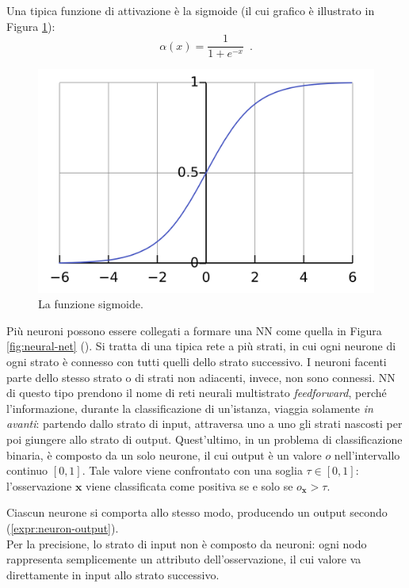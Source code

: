 Una tipica funzione di attivazione è la sigmoide (il cui grafico è illustrato in Figura \ref{fig:sigmoid}):
\begin{equation}
    \alpha(x) = \frac{1}{1+e^{-x}} \enspace .
\end{equation}

\begin{figure}[ht]
    \centering
    \includegraphics[width=0.5\linewidth]{images/sigmoid.png}
    \caption{La funzione sigmoide.}
    \label{fig:sigmoid}
\end{figure}

Più neuroni possono essere collegati a formare una NN come quella in Figura \ref{fig:neural-net} (\cite{zhou2021ml}). Si tratta di una tipica rete a più strati, in cui ogni neurone di ogni strato è connesso con tutti quelli dello strato successivo. I neuroni facenti parte dello stesso strato o di strati non adiacenti, invece, non sono connessi. NN di questo tipo prendono il nome di reti neurali multistrato \textit{feedforward}, perché l'informazione, durante la classificazione di un'istanza, viaggia solamente \textit{in avanti}: partendo dallo strato di input, attraversa uno a uno gli strati nascosti per poi giungere allo strato di output. Quest'ultimo, in un problema di classificazione binaria, è composto da un solo neurone, il cui output è un valore $o$ nell'intervallo continuo $[0,1]$. Tale valore viene confrontato con una soglia $\tau \in [0,1]$: l'osservazione $\mathbf{x}$ viene classificata come positiva se e solo se $o_{\mathbf{x}} > \tau$.

Ciascun neurone si comporta allo stesso modo, producendo un output secondo (\ref{expr:neuron-output}). \\
Per la precisione, lo strato di input non è composto da neuroni: ogni nodo rappresenta semplicemente un attributo dell'osservazione, il cui valore va direttamente in input allo strato successivo.

